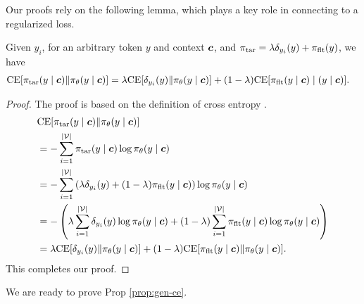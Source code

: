 Our proofs rely on the following lemma, which plays a key role in connecting {\NAME} to a regularized loss. 

\begin{lemma}
\label{lem:to-ce}
Given $y_i$, for an arbitrary token $y$ and context ${\boldsymbol{c}}$, and $\pit = \lambda \de{y_i}{y} + \pif (y)$, we have 
\begin{align}
\label{eq:ce-reg}
\ce [\pit (y \mid \cv) \| \pil(y \mid \cv)]
&= 
\lambda \ce [\de{y_i}{y} \| \pil (y \mid \cv)] + (1 - \lambda) \ce [\pif(y \mid \cv) \mid (y \mid \cv)]. 
\end{align}
\end{lemma}


\begin{proof}
The proof is based on the definition of cross entropy \citep{cover1999elements}. 
\begin{align}
\notag 
& \ce [\pit (y \mid \cv) \| \pil(y \mid \cv)] \\
&= 
\notag 
- \sum_{i=1}^{|\mathcal V|} \pit(y \mid \cv) \log \pil (y \mid \cv) \\
&= 
\notag 
- \sum_{i=1}^{|\mathcal V|}  \left( \lambda \de{y_i}{y} + (1 - \lambda) \pif (y \mid \cv) \right)  \log \pil (y \mid \cv) \\ 
&= 
\notag 
- \left( \lambda \sum_{i=1}^{|\mathcal V|} \de{y_i}{y} \log \pil (y \mid \cv) + (1 - \lambda) \sum_{i=1}^{|\mathcal V|} \pif (y \mid \cv)  \log \pil (y \mid \cv)  \right) \\ 
&= 
\label{eq:to-ce} 
\lambda \ce [\de{y_i}{y} \| \pil (y \mid \cv)] + (1 - \lambda) \ce [\pif(y \mid \cv) \| \pil (y \mid \cv)].
\end{align}
This completes our proof. 
\end{proof}
We are ready to prove Prop \ref{prop:gen-ce}. 


